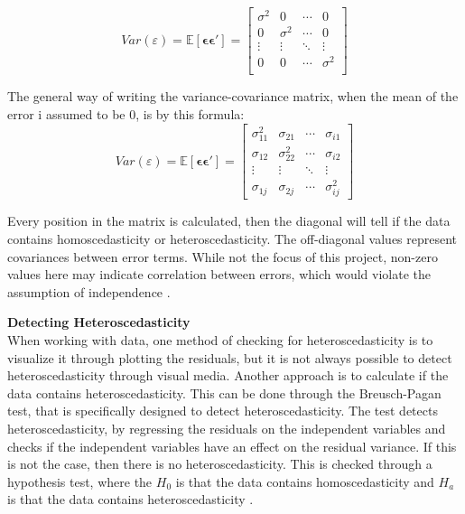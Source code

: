 	
\begin{equation}
Var(\varepsilon) = \mathbb{E}[\boldsymbol{\epsilon} \boldsymbol{\epsilon}'] = 
\left[
\begin{array}{cccc}
	\sigma^2 & 0        & \cdots & 0 \\
	0        & \sigma^2 & \cdots & 0 \\
	\vdots   & \vdots   & \ddots & \vdots \\
	0        & 0        & \cdots & \sigma^2 \\
\end{array}
\right]
\end{equation}


\noindent The general way of writing the variance-covariance matrix, when the mean of the error i assumed to be $0$, is by this formula:
\begin{equation}
Var(\varepsilon) = \mathbb{E}[\boldsymbol{\epsilon} \boldsymbol{\epsilon}'] = 
\left[
\begin{array}{cccc}
	\sigma^2_{11} & \sigma_{21} & \cdots & \sigma_{i1} \\
	\sigma_{12} & \sigma^2_{22} & \cdots & \sigma_{i2} \\
	\vdots      & \vdots      & \ddots & \vdots      \\
	\sigma_{1j} & \sigma_{2j} & \cdots & \sigma^2_{ij}
\end{array}
\right]
\end{equation}

\noindent Every position in the matrix is calculated, then the diagonal will tell if the data contains homoscedasticity or heteroscedasticity. The off-diagonal values represent covariances between error terms. While not the focus of this project, non-zero values here may indicate correlation between errors, which would violate the assumption of independence \cite{Heteroscedasticity} . \newline 

\noindent \textbf{Detecting Heteroscedasticity} \\
When working with data, one method of checking for heteroscedasticity is to visualize it through plotting the residuals, but it is not always possible to detect heteroscedasticity through visual media. Another approach is to calculate if the data contains heteroscedasticity. This can be done through the Breusch-Pagan test, that is specifically designed to detect heteroscedasticity. The test detects heteroscedasticity, by regressing the residuals on the independent variables and checks if the independent variables have an effect on the residual variance. If this is not the case, then there is no heteroscedasticity. This is checked through a hypothesis test, where the $H_0$ is that the data contains homoscedasticity and $H_a$ is that the data contains heteroscedasticity \cite{HomoSce}. \newline


